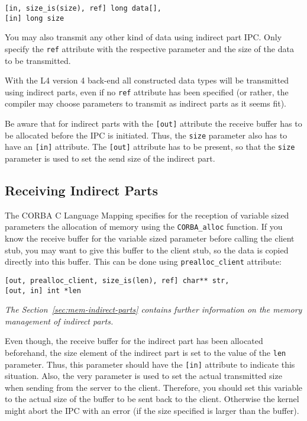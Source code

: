 \begin{verbatim}
[in, size_is(size), ref] long data[],
[in] long size
\end{verbatim}

You may also transmit any other kind of data using indirect part IPC. Only
specify the \verb|ref| attribute with the respective parameter and the size of
the data to be transmitted. 

With the L4 version 4 back-end all constructed data types will be transmitted
using indirect parts, even if no \verb|ref| attribute has been specified (or
rather, the compiler may choose parameters to transmit as indirect parts as it
seems fit).

Be aware that for indirect parts with the \verb|[out]| attribute the receive
buffer has to be allocated before the IPC is initiated.  Thus, the \verb|size|
parameter also has to have an \verb|[in]| attribute. The \verb|[out]|
attribute has to be present, so that the \verb|size| parameter is used to set
the send size of the indirect part.

\subsection{Receiving Indirect Parts}

The CORBA C Language Mapping specifies for the reception of variable sized
parameters the allocation of memory using the \verb|CORBA_alloc| function.  If
you know the receive buffer for the variable sized parameter before calling
the client stub, you may want to give this buffer to the client stub, so the
data is copied directly into this buffer. This can be done using
\verb|prealloc_client| attribute:

\begin{verbatim}
[out, prealloc_client, size_is(len), ref] char** str,
[out, in] int *len
\end{verbatim}

{\em The Section~\ref{sec:mem-indirect-parts} contains further information on
the memory management of indirect parts.}

Even though, the receive buffer for the indirect part has been allocated
beforehand, the size element of the indirect part is set to the value of the
\verb|len| parameter.  Thus, this parameter should have the \verb|[in]|
attribute to indicate this situation.  Also, the very parameter is used to set
the actual transmitted size when sending from the server to the client.
Therefore, you should set this variable to the actual size of the buffer to be
sent back to the client.  Otherwise the kernel might abort the IPC with an
error (if the size specified is larger than the buffer).

